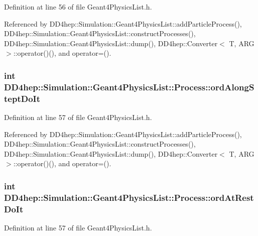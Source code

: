 Definition at line 56 of file Geant4PhysicsList.h.

Referenced by DD4hep::Simulation::Geant4PhysicsList::addParticleProcess(), DD4hep::Simulation::Geant4PhysicsList::constructProcesses(), DD4hep::Simulation::Geant4PhysicsList::dump(), DD4hep::Converter$<$ T, ARG $>$::operator()(), and operator=().\hypertarget{class_d_d4hep_1_1_simulation_1_1_geant4_physics_list_1_1_process_a392bb771bc353a55146a63793868fdd9}{
\subsubsection[{ordAlongSteptDoIt}]{\setlength{\rightskip}{0pt plus 5cm}int {\bf DD4hep::Simulation::Geant4PhysicsList::Process::ordAlongSteptDoIt}}}
\label{class_d_d4hep_1_1_simulation_1_1_geant4_physics_list_1_1_process_a392bb771bc353a55146a63793868fdd9}


Definition at line 57 of file Geant4PhysicsList.h.

Referenced by DD4hep::Simulation::Geant4PhysicsList::addParticleProcess(), DD4hep::Simulation::Geant4PhysicsList::constructProcesses(), DD4hep::Simulation::Geant4PhysicsList::dump(), DD4hep::Converter$<$ T, ARG $>$::operator()(), and operator=().\hypertarget{class_d_d4hep_1_1_simulation_1_1_geant4_physics_list_1_1_process_ab2954e7c39774a2eefc0891b8b5cf000}{
\subsubsection[{ordAtRestDoIt}]{\setlength{\rightskip}{0pt plus 5cm}int {\bf DD4hep::Simulation::Geant4PhysicsList::Process::ordAtRestDoIt}}}
\label{class_d_d4hep_1_1_simulation_1_1_geant4_physics_list_1_1_process_ab2954e7c39774a2eefc0891b8b5cf000}


Definition at line 57 of file Geant4PhysicsList.h.

